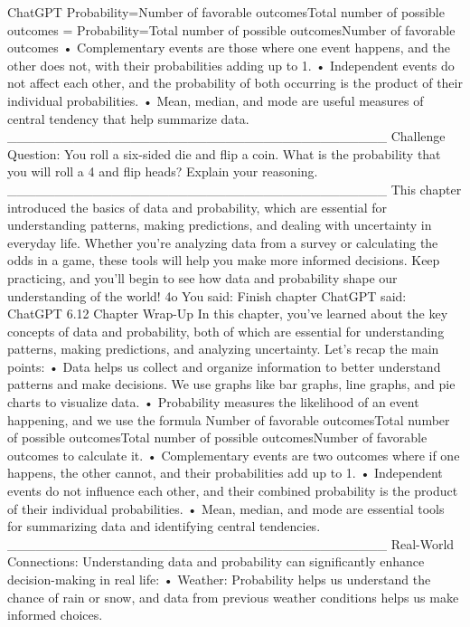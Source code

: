 ChatGPT
Probability=Number of favorable outcomesTotal number of possible outcomes  = Probability=Total number of possible outcomesNumber of favorable outcomes
•	Complementary events are those where one event happens, and the other does not, with their probabilities adding up to 1.
•	Independent events do not affect each other, and the probability of both occurring is the product of their individual probabilities.
•	Mean, median, and mode are useful measures of central tendency that help summarize data.
________________________________________
Challenge Question:
You roll a six-sided die and flip a coin. What is the probability that you will roll a 4 and flip heads? Explain your reasoning.
________________________________________
This chapter introduced the basics of data and probability, which are essential for understanding patterns, making predictions, and dealing with uncertainty in everyday life. Whether you're analyzing data from a survey or calculating the odds in a game, these tools will help you make more informed decisions. Keep practicing, and you'll begin to see how data and probability shape our understanding of the world!
4o
You said:
Finish chapter 
ChatGPT said:
ChatGPT
6.12 Chapter Wrap-Up
In this chapter, you’ve learned about the key concepts of data and probability, both of which are essential for understanding patterns, making predictions, and analyzing uncertainty. Let’s recap the main points:
•	Data helps us collect and organize information to better understand patterns and make decisions. We use graphs like bar graphs, line graphs, and pie charts to visualize data.
•	Probability measures the likelihood of an event happening, and we use the formula Number of favorable outcomesTotal number of possible outcomesTotal number of possible outcomesNumber of favorable outcomes to calculate it.
•	Complementary events are two outcomes where if one happens, the other cannot, and their probabilities add up to 1.
•	Independent events do not influence each other, and their combined probability is the product of their individual probabilities.
•	Mean, median, and mode are essential tools for summarizing data and identifying central tendencies.
________________________________________
Real-World Connections:
Understanding data and probability can significantly enhance decision-making in real life:
•	Weather: Probability helps us understand the chance of rain or snow, and data from previous weather conditions helps us make informed choices.
